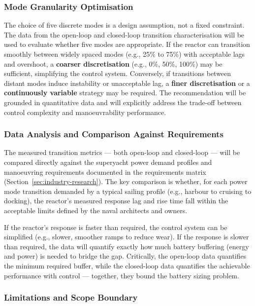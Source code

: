 \documentclass[12pt]{article}
\begin{document}
\subsubsection*{Mode Granularity Optimisation}

The choice of five discrete modes is a design assumption, not a fixed constraint. 
The data from the open-loop and closed-loop transition characterisation will be 
used to evaluate whether five modes are appropriate. If the reactor can transition 
smoothly between widely spaced modes (e.g., 25\% to 75\%) with acceptable lags and 
overshoot, a \textbf{coarser discretisation} (e.g., 0\%, 50\%, 100\%) may be 
sufficient, simplifying the control system. Conversely, if transitions between 
distant modes induce instability or unacceptable lag, a \textbf{finer 
discretisation} or a \textbf{continuously variable} strategy may be required. The 
recommendation will be grounded in quantitative data and will explicitly address 
the trade-off between control complexity and manoeuvrability performance.

\subsubsection*{Data Analysis and Comparison Against Requirements}

The measured transition metrics --- both open-loop and closed-loop --- will be 
compared directly against the superyacht power demand profiles and manoeuvring 
requirements documented in the requirements matrix (Section~\ref{sec:industry-research}). 
The key comparison is whether, for each power mode transition demanded by a typical 
sailing profile (e.g., harbour to cruising to docking), the reactor's measured 
response lag and rise time fall within the acceptable limits defined by the naval 
architects and owners.

If the reactor's response is faster than required, the control system can be 
simplified (e.g., slower, smoother ramps to reduce wear). If the response is slower 
than required, the data will quantify exactly how much battery buffering (energy and 
power) is needed to bridge the gap. Critically, the open-loop data quantifies the 
minimum required buffer, while the closed-loop data quantifies the achievable 
performance with control --- together, they bound the battery sizing problem.

\subsubsection*{Limitations and Scope Boundary}
\end{document}
